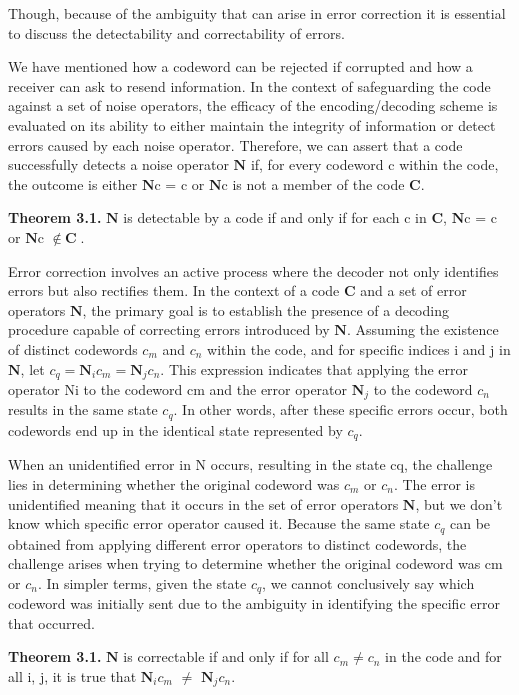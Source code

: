 \documentclass[12pt]{report}
\begin{document}
	\begin{minipage}{1 \textwidth}
		
		Though, because of the ambiguity that can arise in error correction it is essential to discuss the detectability and correctability of errors. \newline
		
		We have mentioned how a codeword can be rejected if corrupted and how a receiver can ask to resend information. In the context of safeguarding the code against a set of noise operators, the efficacy of the encoding/decoding scheme is evaluated on its ability to either maintain the integrity of information or detect errors caused by each noise operator. Therefore, we can assert that a code successfully detects a noise operator $\textbf{N}$ if, for every codeword c within the code, the outcome is either $\textbf{N}$c = c or $\textbf{N}$c is not a member of the code $\textbf{C}$.\newline
		
		\textbf{Theorem 3.1.} $\textbf{N}$ is detectable by a code if and only if for each c in $\textbf{C}$, $\textbf{N}$c = c or $\textbf{N}$c $ \notin \ \textbf{C}$. \newline
		
		
		Error correction involves an active process where the decoder not only identifies errors but also rectifies them. 
		In the context of a code $\textbf{C}$ and a set of error operators $\textbf{N}$, the primary goal is to establish the presence of a decoding procedure capable of correcting errors introduced by $\textbf{N}$. 
		Assuming the existence of distinct codewords $c_m$ and $c_n$ within the code, and for specific indices i and j in $\textbf{N}$, let $c_q = \textbf{N}_ic_m = \textbf{N}_jc_n$. 
		This expression indicates that applying the error operator Ni to the codeword cm and the error operator $\textbf{N}_j$ to the codeword $c_n$ results in the same state $c_q$. In other words, after these specific errors occur, both codewords end up in the identical state represented by $c_q$. \newline
		
		When an unidentified error in N occurs, resulting in the state cq, the challenge lies in determining whether the original codeword was $c_m$ or $c_n$. 
		The error is unidentified meaning that it occurs in the set of error operators $\textbf{N}$, but we don't know which specific error operator caused it.  Because the same state $c_q$ can be obtained from applying different error operators to distinct codewords, the challenge arises when trying to determine whether the original codeword was cm or $c_n$. In simpler terms, given the state $c_q$, we cannot conclusively say which codeword was initially sent due to the ambiguity in identifying the specific error that occurred. \newline 
		
		\textbf{Theorem 3.1.} $\textbf{N}$ is correctable if and only if for all $c_m \neq c_n$ in the code and for all i, j, it is true that $\textbf{N}_ic_m$ $\neq$ $\textbf{N}_jc_n$.
		
		
	\end{minipage}
	
\end{document}
